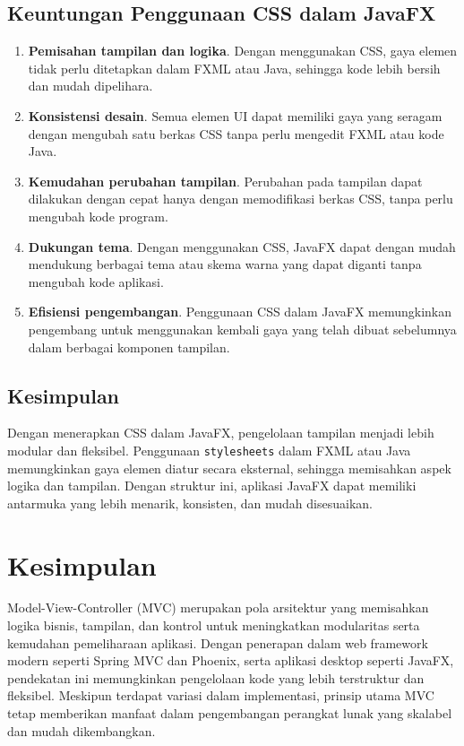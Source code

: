 \subsection{Keuntungan Penggunaan CSS dalam JavaFX}

\begin{enumerate}
	\item \textbf{Pemisahan tampilan dan logika}.  
	Dengan menggunakan CSS, gaya elemen tidak perlu ditetapkan dalam FXML atau Java, sehingga kode lebih bersih dan mudah dipelihara.
	
	\item \textbf{Konsistensi desain}.  
	Semua elemen UI dapat memiliki gaya yang seragam dengan mengubah satu berkas CSS tanpa perlu mengedit FXML atau kode Java.
	
	\item \textbf{Kemudahan perubahan tampilan}.  
	Perubahan pada tampilan dapat dilakukan dengan cepat hanya dengan memodifikasi berkas CSS, tanpa perlu mengubah kode program.
	
	\item \textbf{Dukungan tema}.  
	Dengan menggunakan CSS, JavaFX dapat dengan mudah mendukung berbagai tema atau skema warna yang dapat diganti tanpa mengubah kode aplikasi.
	
	\item \textbf{Efisiensi pengembangan}.  
	Penggunaan CSS dalam JavaFX memungkinkan pengembang untuk menggunakan kembali gaya yang telah dibuat sebelumnya dalam berbagai komponen tampilan.
\end{enumerate}

\subsection{Kesimpulan}

Dengan menerapkan CSS dalam JavaFX, pengelolaan tampilan menjadi lebih modular dan fleksibel. Penggunaan \texttt{stylesheets} dalam FXML atau Java memungkinkan gaya elemen diatur secara eksternal, sehingga memisahkan aspek logika dan tampilan. Dengan struktur ini, aplikasi JavaFX dapat memiliki antarmuka yang lebih menarik, konsisten, dan mudah disesuaikan.


\section{Kesimpulan}

Model-View-Controller (MVC) merupakan pola arsitektur yang memisahkan logika bisnis, tampilan, dan kontrol untuk meningkatkan modularitas serta kemudahan pemeliharaan aplikasi. Dengan penerapan dalam web framework modern seperti Spring MVC dan Phoenix, serta aplikasi desktop seperti JavaFX, pendekatan ini memungkinkan pengelolaan kode yang lebih terstruktur dan fleksibel. Meskipun terdapat variasi dalam implementasi, prinsip utama MVC tetap memberikan manfaat dalam pengembangan perangkat lunak yang skalabel dan mudah dikembangkan.
